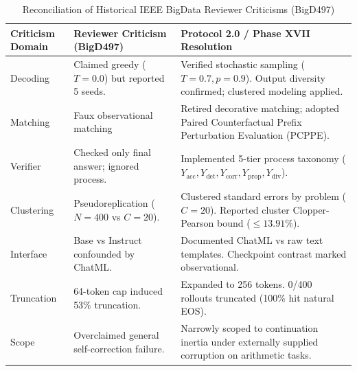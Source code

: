 \documentclass[11pt,letterpaper]{article}
\begin{document}
\begin{table}[htbp]
\centering
\small
\caption{Reconciliation of Historical IEEE BigData Reviewer Criticisms (BigD497)}
\label{tab:app_reconciliation}
\begin{tabularx}{\textwidth}{p{3.0cm}p{4.5cm}X}
\toprule
\textbf{Criticism Domain} & \textbf{Reviewer Criticism (BigD497)} & \textbf{Protocol 2.0 / Phase XVII Resolution} \\
\midrule
Decoding & Claimed greedy ($T=0.0$) but reported 5 seeds. & Verified stochastic sampling ($T=0.7, p=0.9$). Output diversity confirmed; clustered modeling applied. \\
Matching & Faux observational matching & Retired decorative matching; adopted Paired Counterfactual Prefix Perturbation Evaluation (PCPPE). \\
Verifier & Checked only final answer; ignored process. & Implemented 5-tier process taxonomy ($Y_{\text{acc}}, Y_{\text{det}}, Y_{\text{corr}}, Y_{\text{prop}}, Y_{\text{div}}$). \\
Clustering & Pseudoreplication ($N=400$ vs $C=20$). & Clustered standard errors by problem ($C=20$). Reported cluster Clopper-Pearson bound ($\le 13.91\%$). \\
Interface & Base vs Instruct confounded by ChatML. & Documented ChatML vs raw text templates. Checkpoint contrast marked observational. \\
Truncation & 64-token cap induced 53\% truncation. & Expanded to 256 tokens. 0/400 rollouts truncated (100\% hit natural EOS). \\
Scope & Overclaimed general self-correction failure. & Narrowly scoped to continuation inertia under externally supplied corruption on arithmetic tasks. \\
\bottomrule
\end{tabularx}
\end{table}
\end{document}
